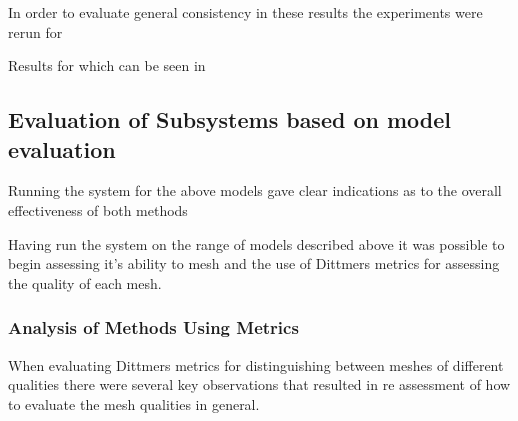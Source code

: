 
\noindent










In order to evaluate general consistency in these results the experiments were rerun for 


Results for which can be seen in 


\newpage
\subsection{Evaluation of Subsystems based on model evaluation}
Running the system for the above models gave clear indications as to the overall effectiveness of both methods

Having run the system on the range of models described above it was possible to begin assessing it's ability to mesh and the use of Dittmers metrics for assessing 
the quality of each mesh.

\subsubsection{Analysis of Methods Using Metrics}
When evaluating Dittmers metrics for distinguishing between meshes of different qualities there were several key observations that resulted in re assessment of how to evaluate the mesh qualities in general.



